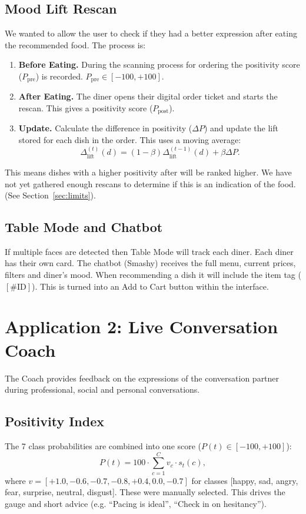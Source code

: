 \documentclass[conference]{IEEEtran}
\begin{document}
\subsection{Mood Lift Rescan}
We wanted to allow the user to check if they had a better expression after eating the recommended food. The process is:
\begin{enumerate}
    \item \textbf{Before Eating.} During the scanning process for ordering the positivity score ($P_{\text{pre}}$) is recorded. $P_{\text{pre}} \in [-100, +100]$.
    \item \textbf{After Eating.} The diner opens their digital order ticket and starts the rescan. This gives a positivity score ($P_{\text{post}}$).
    \item \textbf{Update.} Calculate the difference in positivity ($\Delta P$) and update the lift stored for each dish in the order. This uses a moving average:
    \begin{equation}
    \Delta_{\text{lift}}^{(t)}(d) = (1 - \beta) \Delta_{\text{lift}}^{(t-1)}(d) + \beta \Delta P.
    \end{equation}
\end{enumerate}
This means dishes with a higher positivity after will be ranked higher. We have not yet gathered enough rescans to determine if this is an indication of the food. (See Section~\ref{sec:limits}).

\subsection{Table Mode and Chatbot}
If multiple faces are detected then Table Mode will track each diner. Each diner has their own card. The chatbot (Smashy) receives the full menu, current prices, filters and diner's mood. When recommending a dish it will include the item tag ($[\#\text{ID}]$). This is turned into an Add to Cart button within the interface.

\section{Application 2: Live Conversation Coach}
The Coach provides feedback on the expressions of the conversation partner during professional, social and personal conversations.

\subsection{Positivity Index}
The 7 class probabilities are combined into one score ($P(t) \in [-100, +100]$):
\begin{equation}
P(t) = 100 \cdot \sum_{c=1}^C v_c \cdot s_t(c),
\end{equation}
where $v = [+1.0, -0.6, -0.7, -0.8, +0.4, 0.0, -0.7]$ for classes [happy, sad, angry, fear, surprise, neutral, disgust]. These were manually selected. This drives the gauge and short advice (e.g. ``Pacing is ideal'', ``Check in on hesitancy'').
\end{document}
